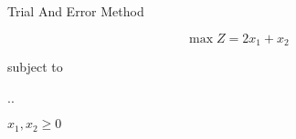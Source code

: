 ﻿\begin{frameExample}{Trial And Error Method  \label{example:2-9-3_Gupta-ebook}}{}

  \[     \max Z = 2x_1 + x_2 \]

  {\centering
    subject to

    \sysdelim..%

    \vspace{5mm}
    $    x_1, x_2  \geq 0$
    \par}


\end{frameExample}

